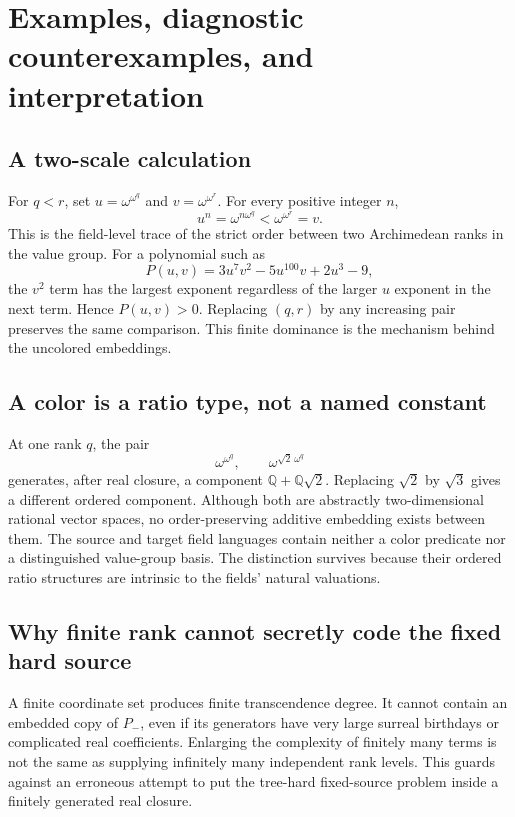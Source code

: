 \documentclass[11pt,a4paper]{article}
\numberwithin{equation}{section}
\theoremstyle{definition}
\theoremstyle{remark}
\newcommand{\Q}{\mathbb Q}
\begin{document}
\section{Examples, diagnostic counterexamples, and interpretation}
\label{csf:sec:examples}

\subsection{A two-scale calculation}

For $q<r$, set $u=\omega^{\omega^q}$ and $v=\omega^{\omega^r}$. For every
positive integer $n$,
\[
 u^n=\omega^{n\omega^q}<\omega^{\omega^r}=v.
\]
This is the field-level trace of the strict order between two
Archimedean ranks in the value group. For a polynomial such as
\[
 P(u,v)=3u^7v^2-5u^{100}v+2u^3-9,
\]
the $v^2$ term has the largest exponent regardless of the larger $u$
exponent in the next term. Hence $P(u,v)>0$. Replacing $(q,r)$ by any
increasing pair preserves the same comparison. This finite dominance is
the mechanism behind the uncolored embeddings.

\subsection{A color is a ratio type, not a named constant}

At one rank $q$, the pair
\[
 \omega^{\omega^q},\qquad \omega^{\sqrt2\,\omega^q}
\]
generates, after real closure, a component $\Q+\Q\sqrt2$. Replacing
$\sqrt2$ by $\sqrt3$ gives a different ordered component. Although both
are abstractly two-dimensional rational vector spaces, no order-preserving
additive embedding exists between them. The source and target field
languages contain neither a color predicate nor a distinguished value-group
basis. The distinction survives because their ordered ratio structures are
intrinsic to the fields' natural valuations.

\subsection{Why finite rank cannot secretly code the fixed hard source}

A finite coordinate set produces finite transcendence degree. It cannot
contain an embedded copy of $P_-$, even if its generators have very large
surreal birthdays or complicated real coefficients. Enlarging the
complexity of finitely many terms is not the same as supplying infinitely
many independent rank levels. This guards against an erroneous attempt
to put the tree-hard fixed-source problem inside a finitely generated
real closure.
\end{document}
